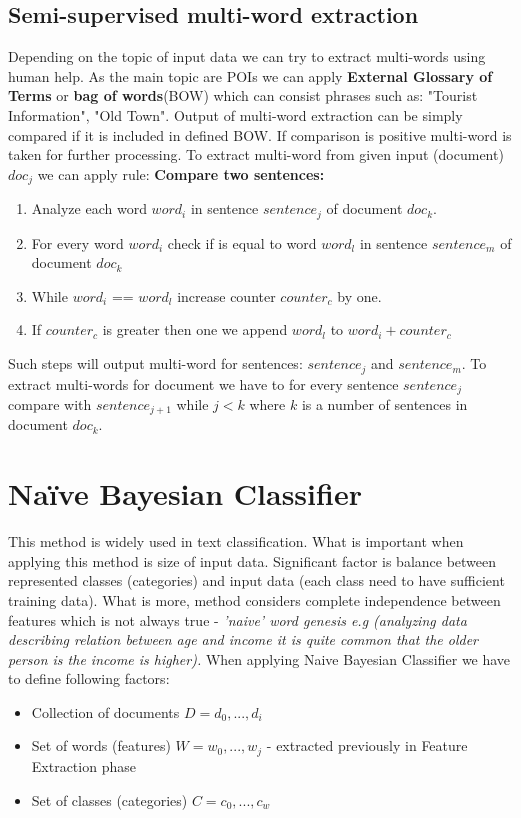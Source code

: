 \subsection{Semi-supervised multi-word extraction}
Depending on the topic of input data we can try to extract multi-words using human help. As the main topic are POIs we can apply \textbf{External Glossary of Terms} or \textbf{bag of words}(BOW)\cite{1} which can consist phrases such as: "Tourist Information", "Old Town". Output of multi-word extraction can be simply compared if it is included in defined BOW. If comparison is positive multi-word is taken for further processing. To extract multi-word from given input (document) $doc_j$ we can apply rule:
\newline\textbf{Compare two sentences:}
\begin{enumerate}	
	\item Analyze each word $word_i$ in sentence $sentence_j$ of document $doc_k$.
	\item For every word $word_i$ check if is equal to word $word_l$ in sentence $sentence_m$ of document $doc_k$
	\item While $word_i$ == $word_l$ increase counter $counter_c$ by one. 
	\item If $counter_c$ is greater then one we append $word_l$ to $word_i + counter_c$ 
\end{enumerate}
Such steps will output multi-word for sentences: $sentence_j$ and $sentence_m$. To extract multi-words for document we have to for every sentence $sentence_j$ compare with $sentence_{j+1}$ while $j<k$ where $k$ is a number of sentences in document $doc_k$.

\section{Naïve Bayesian Classifier}
This method is widely used in text classification. What is important when applying this method is size of input data. Significant factor is balance between represented classes (categories) and input data (each class need to have sufficient training data). What is more, method considers complete independence between features which is not always true - \textit{'naive' word genesis e.g (analyzing data describing relation between age and income it is quite common that the older person is the income is higher).} \cite{4}
\newline When applying Naive Bayesian Classifier we have to define following factors:
\begin{itemize}
	\item Collection of documents $D = {d_0,...,d_i}$
	\item Set of words (features) $W = {w_0,...,w_j}$ - extracted previously in Feature Extraction phase
	\item Set of classes (categories) $C = {c_0,...,c_w}$
\end{itemize}  
 
